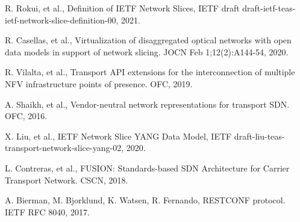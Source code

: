 \documentclass[journal,article,submit,moreauthors,pdftex]{Definitions/mdpi}
\begin{document}




%

\begin{thebibliography}{999}
R. Rokui, et al., Definition of IETF Network Slices, IETF draft draft-ietf-teas-ietf-network-slice-definition-00, 2021.

R. Casellas, et al., Virtualization of disaggregated optical networks with open data models in support of network slicing. JOCN Feb 1;12(2):A144-54, 2020.


R. Vilalta, et al., Transport API extensions for the interconnection of multiple NFV infrastructure points of presence. OFC, 2019.

A. Shaikh, et al., Vendor-neutral network representations for transport SDN. OFC, 2016.



X. Liu, et al., IETF Network Slice YANG Data Model, IETF draft-liu-teas-transport-network-slice-yang-02, 2020.

L. Contreras, et al., FUSION: Standards-based SDN Architecture for Carrier Transport Network. CSCN, 2018.

A. Bierman, M. Bjorklund, K. Watsen, R. Fernando, RESTCONF protocol. IETF RFC 8040, 2017.
\end{thebibliography}
\end{document}
